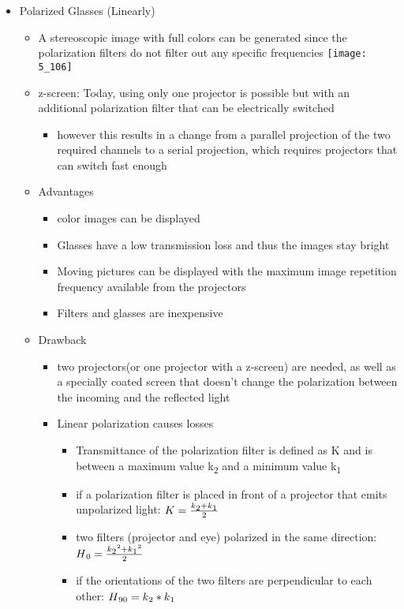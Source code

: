 \documentclass{standalone}
\begin{document}
\begin{itemize}
	\item Polarized Glasses (Linearly)
	\begin{itemize}
		\item A stereoscopic image with full colors can be generated since the polarization filters do not filter out any specific frequencies
		\texttt{[image: 5\_106]}
		\item z-screen: Today, using only one projector is possible but with an additional polarization filter that can be electrically switched
			\begin{itemize}
				\item however this results in a change from a parallel projection of the two required channels to a serial projection, which requires projectors that can switch fast enough
			\end{itemize}
		\item Advantages
			\begin{itemize}
				\item color images can be displayed 
				\item Glasses have a low transmission loss and thus the images stay bright
				\item Moving pictures can be displayed with the maximum image repetition frequency available from the projectors
				\item Filters and glasses are inexpensive
			\end{itemize} 
		\item Drawback
			\begin{itemize}
				\item two projectors(or one projector with a z-screen) are needed, as well as a specially coated screen that doesn't change the polarization between the incoming and the reflected light
				\item Linear polarization causes losses
				\begin{itemize}
					\item Transmittance of the polarization filter is defined as K and is between a maximum value k\textsubscript{2} and a minimum value  k\textsubscript{1}
					\item if a polarization filter is placed in front of a projector that emits unpolarized light: $ K = \frac{ k\textsubscript{2} + k\textsubscript{1}}{2} $
					\item two filters (projector and eye) polarized in the same direction: $ H\textsubscript{0} = \frac{ k\textsubscript{2}^2 + k\textsubscript{1}^2}{2} $
					\item if the orientations of the two filters are perpendicular to each other: $ H\textsubscript{90} = k\textsubscript{2}*k\textsubscript{1} $ 


\end{itemize}
\end{itemize}
\end{itemize}
\end{itemize}
\end{document}
